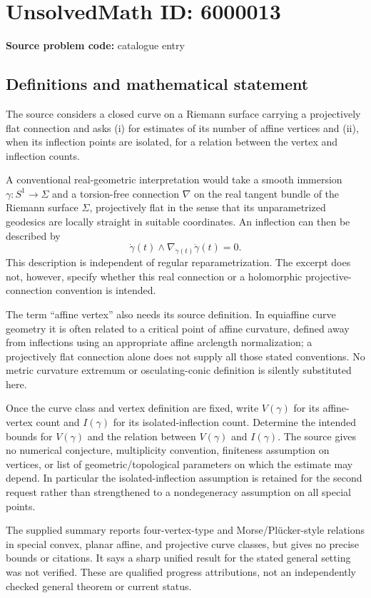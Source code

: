 \documentclass[11pt]{article}
\begin{document}
\section*{UnsolvedMath ID: 6000013}
\textbf{Source problem code:} catalogue entry
\subsection{Definitions and mathematical statement}
The source considers a closed curve on a Riemann surface carrying a projectively flat connection and asks (i) for estimates of its number of affine vertices and (ii), when its inflection points are isolated, for a relation between the vertex and inflection counts.

A conventional real-geometric interpretation would take a smooth immersion \(\gamma:S^1\to\Sigma\) and a torsion-free connection \(\nabla\) on the real tangent bundle of the Riemann surface \(\Sigma\), projectively flat in the sense that its unparametrized geodesics are locally straight in suitable coordinates. An inflection can then be described by
\[
 \dot\gamma(t)\wedge\nabla_{\dot\gamma(t)}\dot\gamma(t)=0.
\]
This description is independent of regular reparametrization. The excerpt does not, however, specify whether this real connection or a holomorphic projective-connection convention is intended.

The term ``affine vertex'' also needs its source definition. In equiaffine curve geometry it is often related to a critical point of affine curvature, defined away from inflections using an appropriate affine arclength normalization; a projectively flat connection alone does not supply all those stated conventions. No metric curvature extremum or osculating-conic definition is silently substituted here.

Once the curve class and vertex definition are fixed, write \(V(\gamma)\) for its affine-vertex count and \(I(\gamma)\) for its isolated-inflection count. Determine the intended bounds for \(V(\gamma)\) and the relation between \(V(\gamma)\) and \(I(\gamma)\). The source gives no numerical conjecture, multiplicity convention, finiteness assumption on vertices, or list of geometric/topological parameters on which the estimate may depend. In particular the isolated-inflection assumption is retained for the second request rather than strengthened to a nondegeneracy assumption on all special points.

The supplied summary reports four-vertex-type and Morse/Pl\"ucker-style relations in special convex, planar affine, and projective curve classes, but gives no precise bounds or citations. It says a sharp unified result for the stated general setting was not verified. These are qualified progress attributions, not an independently checked general theorem or current status.
\end{document}

